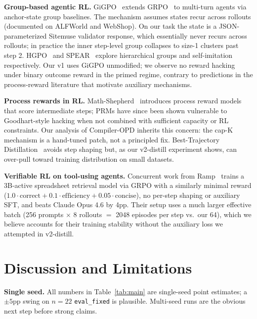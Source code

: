 \documentclass[10pt]{article}
\begin{document}
\textbf{Group-based agentic RL.} GiGPO~\cite{zeng2025gigpo} extends
GRPO~\cite{shao2024grpo} to multi-turn agents via anchor-state group
baselines. The mechanism assumes states recur across rollouts
(documented on ALFWorld and WebShop). On our task the state is a
JSON-parameterized Sitemuse validator response, which essentially
never recurs across rollouts; in practice the inner step-level group
collapses to size-1 clusters past step 2. HGPO~\cite{feng2026hgpo} and
SPEAR~\cite{spear2026} explore hierarchical groups and self-imitation
respectively. Our v1 uses GiGPO unmodified; we observe no reward
hacking under binary outcome reward in the primed regime, contrary to
predictions in the process-reward literature that motivate auxiliary
mechanisms.

\textbf{Process rewards in RL.} Math-Shepherd~\cite{wang2024mathshepherd}
introduces process reward models that score intermediate steps; PRMs
have since been shown vulnerable to Goodhart-style hacking when not
combined with sufficient capacity or RL constraints. Our analysis of
Compiler-OPD inherits this concern: the cap-K mechanism is a hand-tuned
patch, not a principled fix. Best-Trajectory
Distillation~\cite{lambert2025tulu3} avoids step shaping but, as our
v2-distill experiment shows, can over-pull toward training distribution
on small datasets.

\textbf{Verifiable RL on tool-using agents.} Concurrent work from
Ramp~\cite{ramp2026fastask} trains a 3B-active spreadsheet retrieval
model via GRPO with a similarly minimal reward
($1.0 \cdot \mathrm{correct} + 0.1 \cdot \mathrm{efficiency} + 0.05 \cdot \mathrm{concise}$),
no per-step shaping or auxiliary SFT, and beats Claude Opus 4.6 by 4pp.
Their setup uses a much larger effective batch (256 prompts $\times$ 8 rollouts
$=$ 2048 episodes per step vs.\ our 64), which we believe accounts for
their training stability without the auxiliary loss we
attempted in v2-distill.

\section{Discussion and Limitations}
\label{sec:discussion}

\textbf{Single seed.} All numbers in Table~\ref{tab:main} are
single-seed point estimates; a $\pm 5$pp swing on $n{=}22$
\texttt{eval\_fixed} is plausible. Multi-seed runs are the obvious
next step before strong claims.
\end{document}
